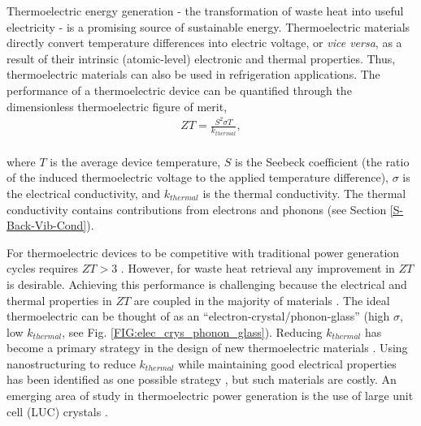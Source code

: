 \documentclass[letterpaper,12pt]{article}
\begin{document}
Thermoelectric energy generation - the transformation of waste heat into useful electricity - is a promising source of sustainable energy.\cite{ADMA:ADMA200600527} Thermoelectric materials directly convert temperature differences into electric voltage, or \emph{vice versa},  as a result of their intrinsic (atomic-level) electronic and thermal properties. Thus, thermoelectric materials can also be used in refrigeration applications.  The performance of a thermoelectric device can be quantified through the dimensionless thermoelectric figure of merit,
\begin{equation}\label{EQ:M:ZT}
\begin{split}
ZT = \frac{S^2\sigma T}{k_{thermal}}, \\
\end{split}
\end{equation}

where $T$ is the average device temperature, $S$ is the Seebeck coefficient (the ratio of the induced thermoelectric voltage to the applied temperature difference), $\sigma$ is the electrical conductivity, and $k_{thermal}$  is the thermal conductivity. The thermal conductivity contains contributions from electrons and phonons (see Section \ref{S-Back-Vib-Cond}).  

For thermoelectric devices to be competitive with traditional power generation cycles requires $ZT > 3$ \cite{Chen_Dresselhaus_Dresselhaus_Fleurial_Caillat_2003}. However, for waste heat retrieval any improvement in $ZT$ is desirable. Achieving this performance is challenging because the electrical and thermal properties in $ZT$ are coupled in the majority of materials \cite{ADMA:ADMA200600527,Chen_Dresselhaus_Dresselhaus_Fleurial_Caillat_2003}. The ideal thermoelectric can be thought of as an “electron-crystal/phonon-glass” (high $\sigma$, low $k_{thermal}$, see Fig. \ref{FIG:elec_crys_phonon_glass}). Reducing $k_{thermal}$ has become a primary strategy in the design of new thermoelectric materials \cite{ADMA:ADMA200600527}.  Using nanostructuring to reduce $k_{thermal}$ while maintaining good electrical properties has been identified as one possible strategy \cite{B822664B}, but such materials are costly. An emerging area of study in thermoelectric power generation is the use of large unit cell (LUC) crystals \cite{nolas1999,ADMA:ADMA200600527}.
\end{document}
